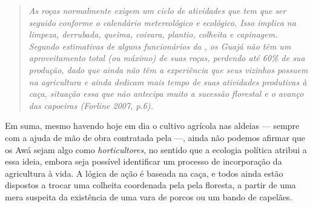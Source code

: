 \begin{quote}
\emph{As roças normalmente exigem um ciclo de atividades que tem que ser
seguido conforme o calendário metereológico e ecológico. Isso implica na
limpeza, derrubada, queima, coivara, plantio, colheita e capinagem.
Segundo estimativas de alguns funcionários da , os Guajá não têm um
aproveitamento total (ou máximo) de suas roças, perdendo até 60\% de sua
produção, dado que ainda não têm a experiência que seus vizinhos possuem
na agricultura e ainda dedicam mais tempo de suas atividades produtivas
à caça, situação essa que não antecipa muito a sucessão florestal e o
avanço das capoeiras (Forline 2007, p.6).}
\end{quote}

Em suma, mesmo havendo hoje em dia o cultivo agrícola nas aldeias ---
sempre com a ajuda de mão de obra contratada pela  ---, ainda não
podemos afirmar que os Awá sejam algo como \emph{horticultores}, no
sentido que a ecologia política atribui a essa ideia, embora seja
possível identificar um processo de incorporação da agricultura à vida.
A lógica de ação é baseada na caça, e todos ainda estão dispostos a
trocar uma colheita coordenada pela  pela floresta, a partir de uma
mera suspeita da existência de uma vara de porcos ou um bando de
capelães.


